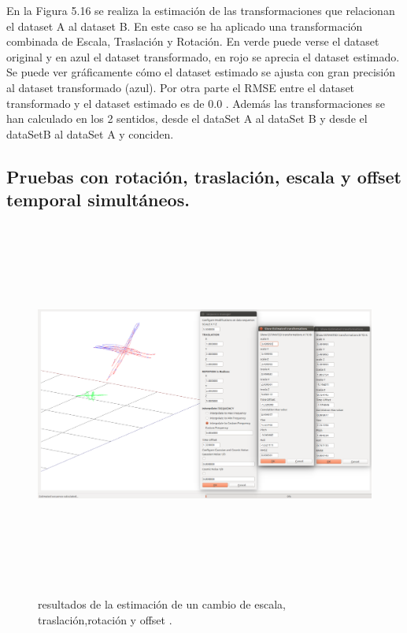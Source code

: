 En la Figura 5.16 se realiza la estimación de las transformaciones que relacionan el dataset A al dataset B. En este caso se ha aplicado una transformación combinada de Escala, Traslación y Rotación. En verde puede verse el dataset original y en azul el dataset transformado, en rojo se aprecia el dataset estimado.
Se puede ver gráficamente cómo el dataset estimado se ajusta con gran precisión al dataset transformado (azul).
Por otra parte el RMSE entre el dataset transformado y el dataset estimado es de 0.0
. Además las transformaciones se han calculado en los 2 sentidos, desde el dataSet A  al dataSet B y desde el dataSetB al dataSet A y conciden.

\subsection{Pruebas con rotación, traslación, escala y offset temporal simultáneos.}
\begin{figure}[h]
\begin{center}
\label{fig:opciones de View}\includegraphics[height=12.0cm,width=18.0cm]{img/cap6/Escala_Trasla_Rota_Offset_abba.png}
\hspace{0.5cm}

\end{center}

\caption{ resultados de la estimación de un cambio de escala, traslación,rotación y offset .}
\end{figure}

